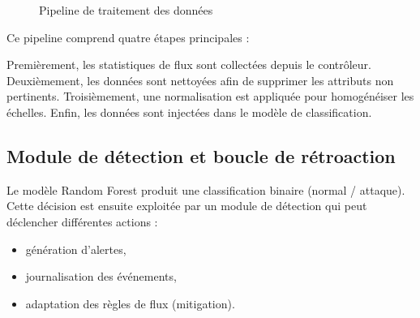\documentclass[11pt]{article}
\begin{document}
\begin{figure}[h]
\centering
\noindent{}
\caption{Pipeline de traitement des données}

\end{figure}

Ce pipeline comprend quatre étapes principales :

Premièrement, les statistiques de flux sont collectées depuis le contrôleur. Deuxièmement, les données sont nettoyées afin de supprimer les attributs non pertinents. Troisièmement, une normalisation est appliquée pour homogénéiser les échelles. Enfin, les données sont injectées dans le modèle de classification.

\subsection{Module de détection et boucle de rétroaction}

Le modèle Random Forest produit une classification binaire (normal / attaque). Cette décision est ensuite exploitée par un module de détection qui peut déclencher différentes actions :

\begin{itemize}
    \item génération d’alertes,
    \item journalisation des événements,
    \item adaptation des règles de flux (mitigation).
\end{itemize}
\end{document}
